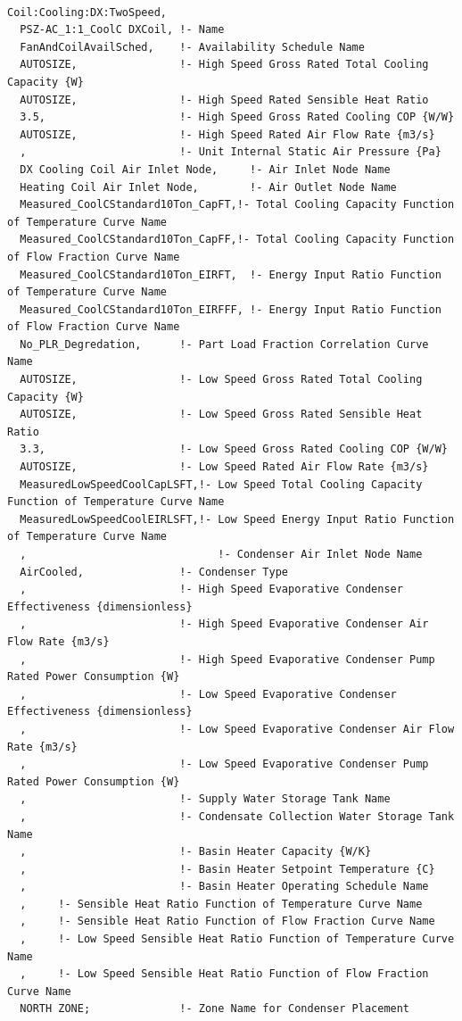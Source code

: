 \begin{lstlisting}

Coil:Cooling:DX:TwoSpeed,
  PSZ-AC_1:1_CoolC DXCoil, !- Name
  FanAndCoilAvailSched,    !- Availability Schedule Name
  AUTOSIZE,                !- High Speed Gross Rated Total Cooling Capacity {W}
  AUTOSIZE,                !- High Speed Rated Sensible Heat Ratio
  3.5,                     !- High Speed Gross Rated Cooling COP {W/W}
  AUTOSIZE,                !- High Speed Rated Air Flow Rate {m3/s}
  ,                        !- Unit Internal Static Air Pressure {Pa}
  DX Cooling Coil Air Inlet Node,     !- Air Inlet Node Name
  Heating Coil Air Inlet Node,        !- Air Outlet Node Name
  Measured_CoolCStandard10Ton_CapFT,!- Total Cooling Capacity Function of Temperature Curve Name
  Measured_CoolCStandard10Ton_CapFF,!- Total Cooling Capacity Function of Flow Fraction Curve Name
  Measured_CoolCStandard10Ton_EIRFT,  !- Energy Input Ratio Function of Temperature Curve Name
  Measured_CoolCStandard10Ton_EIRFFF, !- Energy Input Ratio Function of Flow Fraction Curve Name
  No_PLR_Degredation,      !- Part Load Fraction Correlation Curve Name
  AUTOSIZE,                !- Low Speed Gross Rated Total Cooling Capacity {W}
  AUTOSIZE,                !- Low Speed Gross Rated Sensible Heat Ratio
  3.3,                     !- Low Speed Gross Rated Cooling COP {W/W}
  AUTOSIZE,                !- Low Speed Rated Air Flow Rate {m3/s}
  MeasuredLowSpeedCoolCapLSFT,!- Low Speed Total Cooling Capacity Function of Temperature Curve Name
  MeasuredLowSpeedCoolEIRLSFT,!- Low Speed Energy Input Ratio Function of Temperature Curve Name
  ,                              !- Condenser Air Inlet Node Name
  AirCooled,               !- Condenser Type
  ,                        !- High Speed Evaporative Condenser Effectiveness {dimensionless}
  ,                        !- High Speed Evaporative Condenser Air Flow Rate {m3/s}
  ,                        !- High Speed Evaporative Condenser Pump Rated Power Consumption {W}
  ,                        !- Low Speed Evaporative Condenser Effectiveness {dimensionless}
  ,                        !- Low Speed Evaporative Condenser Air Flow Rate {m3/s}
  ,                        !- Low Speed Evaporative Condenser Pump Rated Power Consumption {W}
  ,                        !- Supply Water Storage Tank Name
  ,                        !- Condensate Collection Water Storage Tank Name
  ,                        !- Basin Heater Capacity {W/K}
  ,                        !- Basin Heater Setpoint Temperature {C}
  ,                        !- Basin Heater Operating Schedule Name
  ,     !- Sensible Heat Ratio Function of Temperature Curve Name
  ,     !- Sensible Heat Ratio Function of Flow Fraction Curve Name
  ,     !- Low Speed Sensible Heat Ratio Function of Temperature Curve Name
  ,     !- Low Speed Sensible Heat Ratio Function of Flow Fraction Curve Name
  NORTH ZONE;              !- Zone Name for Condenser Placement
\end{lstlisting}

